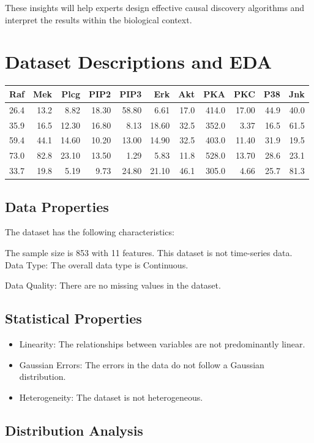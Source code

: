 \documentclass{article}
\begin{document}
These insights will help experts design effective causal discovery algorithms and interpret the results within the biological context.

\section{Dataset Descriptions and EDA}

\begin{tabular}{rrrrrrrrrrr}
\toprule
 Raf &  Mek &  Plcg &  PIP2 &  PIP3 &   Erk &  Akt &   PKA &   PKC &  P38 &  Jnk \\
\midrule
26.4 & 13.2 &  8.82 & 18.30 & 58.80 &  6.61 & 17.0 & 414.0 & 17.00 & 44.9 & 40.0 \\
35.9 & 16.5 & 12.30 & 16.80 &  8.13 & 18.60 & 32.5 & 352.0 &  3.37 & 16.5 & 61.5 \\
59.4 & 44.1 & 14.60 & 10.20 & 13.00 & 14.90 & 32.5 & 403.0 & 11.40 & 31.9 & 19.5 \\
73.0 & 82.8 & 23.10 & 13.50 &  1.29 &  5.83 & 11.8 & 528.0 & 13.70 & 28.6 & 23.1 \\
33.7 & 19.8 &  5.19 &  9.73 & 24.80 & 21.10 & 46.1 & 305.0 &  4.66 & 25.7 & 81.3 \\
\bottomrule
\end{tabular}


\subsection{Data Properties}
The dataset has the following characteristics:

The sample size is 853 with 11 features. This dataset is not time-series data. Data Type: The overall data type is Continuous.

Data Quality: There are no missing values in the dataset.

\subsection{Statistical Properties}
\begin{itemize}
\item Linearity: The relationships between variables are not predominantly linear.
\item Gaussian Errors: The errors in the data do not follow a Gaussian distribution.
\item Heterogeneity: The dataset is not heterogeneous.
\end{itemize}

\subsection{Distribution Analysis}
\end{document}
